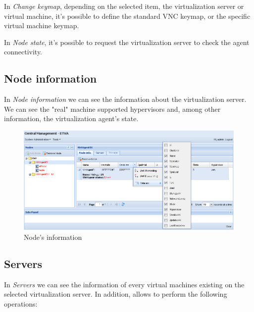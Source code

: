 In \emph{Change keymap}, depending on the selected item, the virtualization server or virtual machine, it's possible to define the standard VNC keymap, or the specific virtual machine keymap.

In \emph{Node state}, it's possible to request the virtualization server to check the agent connectivity.

\subsection{Node information}
\label{sec:nodeinfo}
In \emph{Node information} we can see the information about the virtualization server. We can see the "real" machine supported hypervisors and, among other information, the virtualization agent's state.

\begin{figure}[H]
	\begin{center}
	\includegraphics[scale=0.45]{screenshots/node_info.png}
	\caption{Node's information}
	\label{fig:node_info}
	\end{center}
\end{figure}

\subsection{Servers}
\label{sec:servers}
In \emph{Servers} we can see the information of every virtual machines existing on the selected virtualization server. In addition, allows to perform the following operations:

